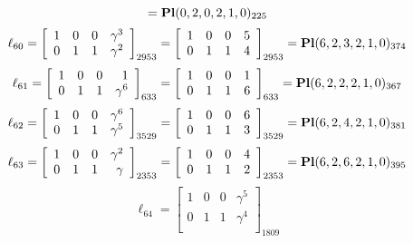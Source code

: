 \documentclass{article}
\begin{document}
{$$={\rm\bf Pl}(0,2,0,2,1,0 )_{225}$$
$$
\ell_{60} = 
\left[
\begin{array}{*{4}{r}}
1 & 0 & 0 & \gamma^{3}\\
0 & 1 & 1 & \gamma^{2}\\
\end{array}
\right]
_{2953}
=
\left[
\begin{array}{*{4}c}
1  & 0  & 0  & 5\\
0  & 1  & 1  & 4\\
\end{array}
\right]_{2953}
={\rm\bf Pl}(6,2,3,2,1,0 )_{374}$$
$$
\ell_{61} = 
\left[
\begin{array}{*{4}{r}}
1 & 0 & 0 & 1\\
0 & 1 & 1 & \gamma^{6}\\
\end{array}
\right]
_{633}
=
\left[
\begin{array}{*{4}c}
1  & 0  & 0  & 1\\
0  & 1  & 1  & 6\\
\end{array}
\right]_{633}
={\rm\bf Pl}(6,2,2,2,1,0 )_{367}$$
$$
\ell_{62} = 
\left[
\begin{array}{*{4}{r}}
1 & 0 & 0 & \gamma^{6}\\
0 & 1 & 1 & \gamma^{5}\\
\end{array}
\right]
_{3529}
=
\left[
\begin{array}{*{4}c}
1  & 0  & 0  & 6\\
0  & 1  & 1  & 3\\
\end{array}
\right]_{3529}
={\rm\bf Pl}(6,2,4,2,1,0 )_{381}$$
$$
\ell_{63} = 
\left[
\begin{array}{*{4}{r}}
1 & 0 & 0 & \gamma^{2}\\
0 & 1 & 1 & \gamma \\
\end{array}
\right]
_{2353}
=
\left[
\begin{array}{*{4}c}
1  & 0  & 0  & 4\\
0  & 1  & 1  & 2\\
\end{array}
\right]_{2353}
={\rm\bf Pl}(6,2,6,2,1,0 )_{395}$$
$$
\ell_{64} = 
\left[
\begin{array}{*{4}{r}}
1 & 0 & 0 & \gamma^{5}\\
0 & 1 & 1 & \gamma^{4}\\
\end{array}
\right]
_{1809}
$$}
\end{document}
